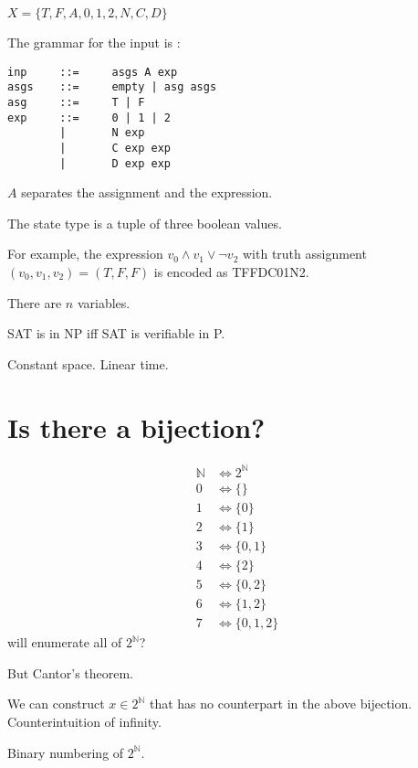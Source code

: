 $X = \{ T, F, A, 0, 1, 2, N, C, D \}$

The grammar for the input is \verb@inp@:
\begin{verbatim}
inp     ::=     asgs A exp
asgs    ::=     empty | asg asgs
asg     ::=     T | F
exp     ::=     0 | 1 | 2
        |       N exp
        |       C exp exp
        |       D exp exp
\end{verbatim}

$A$ separates the assignment and the expression.

The state type is a tuple of three boolean values.

For example, the expression $v_0 \wedge v_1 \vee \neg v_2$ with truth assignment $(v_0,v_1,v_2) = (T,F,F)$ is encoded as TFFDC01N2.

There are $n$ variables.

SAT is in NP iff SAT is verifiable in P.

Constant space. Linear time.

\section{Is there a bijection?}

\begin{align}
    \mathbb N &\iff 2^\mathbb N
    \\ 0 &\iff \{\}
    \\ 1 &\iff \{0\}
    \\ 2 &\iff \{1\}
    \\ 3 &\iff \{0,1\}
    \\ 4 &\iff \{2\}
    \\ 5 &\iff \{0,2\}
    \\ 6 &\iff \{1,2\}
    \\ 7 &\iff \{0,1,2\}
\end{align}
will enumerate all of $2^\mathbb N$?

But Cantor's theorem.

We can construct $x \in 2^\mathbb N$ that has no counterpart in the above bijection.
Counterintuition of infinity.

Binary numbering of $2^\mathbb N$.

